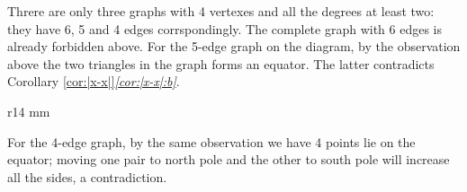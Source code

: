 Threre are only three graphs with 4 vertexes and all the degrees at least two: they have 6, 5 and 4 edges corrspondingly.
The complete graph with 6 edges is already forbidden above.
For the 5-edge graph on the diagram, by the observation above the two triangles in the graph forms an equator.
The latter contradicts Corollary \ref{cor:|x-x|}\textit{\ref{cor:|x-x|:b}}.

{

\hide
\begin{wrapfigure}{r}{14 mm}

\end{wrapfigure}
\unhide

For the 4-edge graph,
by the same observation we have 4 points lie on the equator; 
moving one pair to north pole and the other to south pole will increase all the sides, a contradiction.
\qeds

}